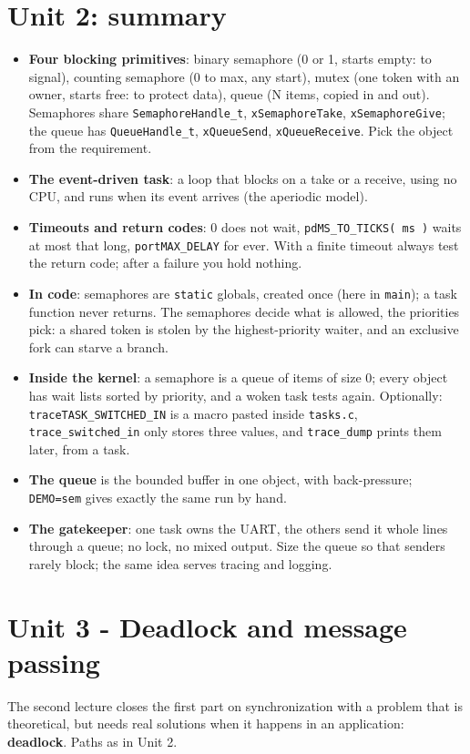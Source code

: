 \section{Unit 2: summary}
\begin{itemize}
    \item \textbf{Four blocking primitives}: binary semaphore (0 or 1, starts empty: to signal), counting semaphore (0 to max, any start), mutex (one token with an owner, starts free: to protect data), queue (N items, copied in and out). Semaphores share \texttt{SemaphoreHandle\_t}, \texttt{xSemaphoreTake}, \texttt{xSemaphoreGive}; the queue has \texttt{QueueHandle\_t}, \texttt{xQueueSend}, \texttt{xQueueReceive}. Pick the object from the requirement.
    \item \textbf{The event-driven task}: a loop that blocks on a take or a receive, using no CPU, and runs when its event arrives (the aperiodic model).
    \item \textbf{Timeouts and return codes}: 0 does not wait, \texttt{pdMS\_TO\_TICKS( ms )} waits at most that long, \texttt{portMAX\_DELAY} for ever. With a finite timeout always test the return code; after a failure you hold nothing.
    \item \textbf{In code}: semaphores are \texttt{static} globals, created once (here in \texttt{main}); a task function never returns. The semaphores decide what is allowed, the priorities pick: a shared token is stolen by the highest-priority waiter, and an exclusive fork can starve a branch.
    \item \textbf{Inside the kernel}: a semaphore is a queue of items of size 0; every object has wait lists sorted by priority, and a woken task tests again. Optionally: \texttt{traceTASK\_SWITCHED\_IN} is a macro pasted inside \texttt{tasks.c}, \texttt{trace\_switched\_in} only stores three values, and \texttt{trace\_dump} prints them later, from a task.
    \item \textbf{The queue} is the bounded buffer in one object, with back-pressure; \texttt{DEMO=sem} gives exactly the same run by hand.
    \item \textbf{The gatekeeper}: one task owns the UART, the others send it whole lines through a queue; no lock, no mixed output. Size the queue so that senders rarely block; the same idea serves tracing and logging.
\end{itemize}

\section{Unit 3 - Deadlock and message passing}
The second lecture closes the first part on synchronization with a problem that is theoretical, but needs real solutions when it happens in an application: \textbf{deadlock}. Paths as in Unit 2.

